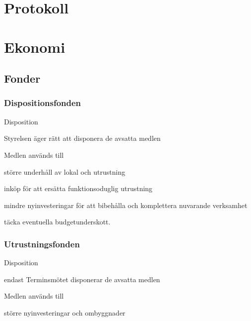 \documentclass[10pt]{article}
\renewcommand{\thesubsection}{\arabic{section}:\Alph{subsection}}
\begin{document}
\section{Protokoll}

\renewcommand*\thesubsection{\arabic{section}:\arabic{subsection}}
\renewcommand*\thesubsubsection
{\arabic{section}:\arabic{subsection}:\Alph{subsubsection}}
\section{Ekonomi}

\subsection{Fonder}

\subsubsection{Dispositionsfonden}
\begin{emptylist}
\item Disposition
    \begin{dashlist}
    \item Styrelsen äger rätt att disponera de avsatta medlen
    \end{dashlist}
\end{emptylist}
\begin{emptylist}
\item Medlen används till
    \begin{dashlist}
    \item större underhåll av lokal och utrustning
    \item inköp för att ersätta funktionsoduglig utrustning
    \item mindre nyinvesteringar för att bibehålla och komplettera nuvarande
        verksamhet
    \item täcka eventuella budgetunderskott.
    \end{dashlist}
\end{emptylist}

\subsubsection{Utrustningsfonden}
\begin{emptylist}
\item Disposition
    \begin{dashlist}
    \item endast Terminsmötet disponerar de avsatta medlen
    \end{dashlist}
\end{emptylist}
\begin{emptylist}
\item Medlen används till
    \begin{dashlist}
    \item större nyinvesteringar och ombyggnader
    \end{dashlist}
\end{emptylist}
\end{document}
